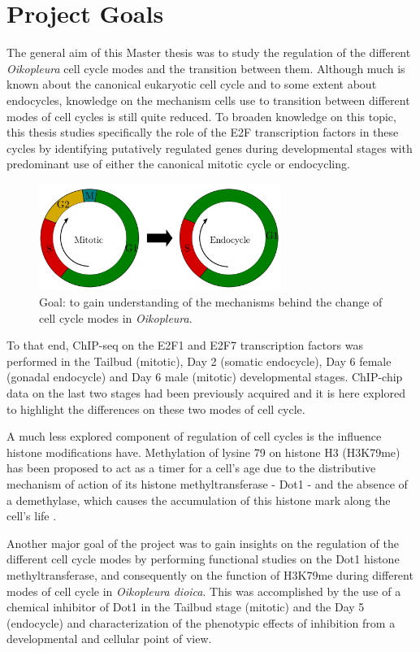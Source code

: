 \documentclass[11pt,twoside,a4paper]{report}
\begin{document}
	\clearpage
	\section{Project Goals}
		The general aim of this Master thesis was to study the regulation of the different \textit{Oikopleura} cell cycle modes and the transition between them. Although much is known about the canonical eukaryotic cell cycle and to some extent about endocycles, knowledge on the mechanism cells use to transition between different modes of cell cycles is still quite reduced.	 To broaden knowledge on this topic, this thesis studies specifically the role of the E2F transcription factors in these cycles by identifying putatively regulated genes during developmental stages with predominant use of either the canonical mitotic cycle or endocycling.
		
		\begin{figure}[here]
			\centering
			\includegraphics[width=0.7\textwidth]{pngs/change_cell-cycle.png}
			\caption{Goal: to gain understanding of the mechanisms behind the change of cell cycle modes in \textit{Oikopleura}.}
			\label{fig:goal_cycles}
		\end{figure}
		
		To that end, ChIP-seq on the E2F1 and E2F7 transcription factors was performed in the Tailbud (mitotic), Day 2 (somatic endocycle), Day 6 female (gonadal endocycle) and Day 6 male (mitotic) developmental stages. ChIP-chip data on the last two stages had been previously acquired and it is here explored to highlight the differences on these two modes of cell cycle.
		
		A much less explored component of regulation of cell cycles is the influence histone modifications have. Methylation of lysine 79 on histone H3 (H3K79me) has been proposed to act as a timer for a cell's age due to the distributive mechanism of action of its histone methyltransferase - Dot1 - and the absence of a demethylase, which causes the accumulation of this histone mark along the cell's life	.
		
		Another major goal of the project was to gain insights on the regulation of the different cell cycle modes by performing functional studies on the Dot1 histone methyltransferase, and consequently on the function of H3K79me during different modes of cell cycle in \textit{Oikopleura dioica}. This was accomplished by the use of a chemical inhibitor of Dot1 in the Tailbud stage (mitotic) and the Day 5 (endocycle) and characterization of the phenotypic effects of inhibition from a developmental and cellular point of view.
\end{document}
